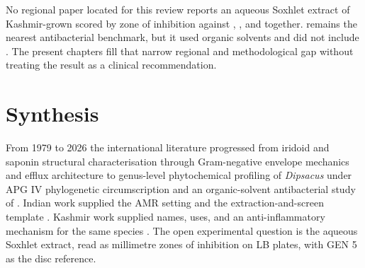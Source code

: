 No regional paper located for this review reports an aqueous Soxhlet extract of Kashmir-grown  scored by zone of inhibition against , , and  together. \citet{drakhshaan2026identification} remains the nearest antibacterial benchmark, but it used organic solvents and did not include . The present chapters fill that narrow regional and methodological gap without treating the result as a clinical recommendation.

\section{Synthesis}

From 1979 to 2026 the international literature progressed from iridoid and saponin structural characterisation \citep{jensen1979cantleyoside,cowan1999plant} through Gram-negative envelope mechanics and efflux architecture \citep{li1995role,hancock2000antibiotic,masuda2000substrate,nikaido2003molecular,chevalier2017porins} to genus-level phytochemical profiling of \textit{Dipsacus} \citep{zhao2011phytochemicals,skala2023dipsacus} under APG IV phylogenetic circumscription \citep{apgiv2016} and an organic-solvent antibacterial study of  \citep{drakhshaan2026identification}. Indian work supplied the AMR setting and the extraction-and-screen template \citep{ahmad2001antimicrobial,laxminarayan2016antibiotic,taneja2019antimicrobial}. Kashmir work supplied names, uses, and an anti-inflammatory mechanism for the same species \citep{lone2015study,hassan2020dipsacus,haq2023cross,ahad2023ethnobotanical}. The open experimental question is the aqueous Soxhlet extract, read as millimetre zones of inhibition on LB plates, with GEN 5 as the disc reference.

\FloatBarrier
